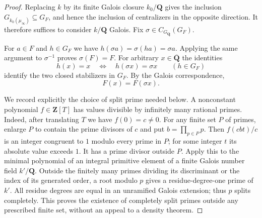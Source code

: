 \documentclass[11pt,a4paper]{article}
\begin{document}
\begin{proof}
Replacing $k$ by its finite Galois closure $k_0/\mathbf Q$ gives the inclusion
$G_{k_0(\mu_\infty)}\subseteq G_F$, and hence the inclusion of centralizers
in the opposite direction. It therefore suffices to consider $k/\mathbf Q$
Galois. Fix $\sigma\in C_{G_{\mathbf Q}}(G_F)$.

For $a\in F$ and $h\in G_F$ we have
$h(\sigma a)=\sigma(ha)=\sigma a$. Applying the same argument to
$\sigma^{-1}$ proves $\sigma(F)=F$. For arbitrary
$x\in\overline{\mathbf Q}$ the identities
\[
 h(x)=x\quad\Longleftrightarrow\quad h(\sigma x)=\sigma x
 \qquad(h\in G_F)
\]
identify the two closed stabilizers in $G_F$. By the Galois correspondence,
\begin{equation}\label{eq:B-stabilizer}
 F(x)=F(\sigma x).
\end{equation}

We record explicitly the choice of split prime needed below. A nonconstant
polynomial $f\in\mathbf Z[T]$ has values divisible by infinitely many
rational primes. Indeed, after translating $T$ we have $f(0)=c\ne0$.
For any finite set $P$ of primes, enlarge $P$ to contain the prime divisors
of $c$ and put $b=\prod_{p\in P}p$. Then
$f(cbt)/c$ is an integer congruent to $1$ modulo every prime in $P$;
for some integer $t$ its absolute value exceeds $1$. It has a prime divisor
outside $P$. Apply this to the minimal polynomial of an integral primitive
element of a finite Galois number field $k'/\mathbf Q$. Outside the finitely
many primes dividing its discriminant or the index of its generated order,
a root modulo $p$ gives a residue-degree-one prime of $k'$. All residue
degrees are equal in an unramified Galois extension; thus $p$ splits
completely. This proves the existence of completely split primes outside
any prescribed finite set, without an appeal to a density theorem.


\end{proof}
\end{document}
